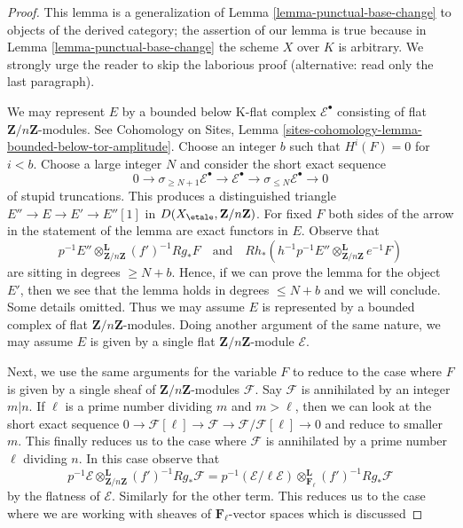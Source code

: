 \begin{proof}
This lemma is a generalization of Lemma \ref{lemma-punctual-base-change}
to objects of the derived category; the assertion of our lemma is true because
in Lemma \ref{lemma-punctual-base-change} the scheme $X$ over $K$
is arbitrary. We strongly urge the reader to skip the laborious proof
(alternative: read only the last paragraph).

\medskip\noindent
We may represent $E$ by a bounded below K-flat complex
$\mathcal{E}^\bullet$ consisting of flat $\mathbf{Z}/n\mathbf{Z}$-modules.
See Cohomology on Sites, Lemma
\ref{sites-cohomology-lemma-bounded-below-tor-amplitude}.
Choose an integer $b$ such that $H^i(F) = 0$ for $i < b$.
Choose a large integer $N$ and consider the short exact sequence
$$
0 \to \sigma_{\geq N + 1}\mathcal{E}^\bullet \to
\mathcal{E}^\bullet \to
\sigma_{\leq N}\mathcal{E}^\bullet \to 0
$$
of stupid truncations. This produces a distinguished triangle
$E'' \to E \to E' \to E''[1]$ in $D(X_\etale, \mathbf{Z}/n\mathbf{Z})$.
For fixed $F$ both sides of the arrow
in the statement of the lemma are exact functors in $E$. Observe that
$$
p^{-1}E'' \otimes_{\mathbf{Z}/n\mathbf{Z}}^\mathbf{L} (f')^{-1}Rg_*F
\quad\text{and}\quad
Rh_*(h^{-1}p^{-1}E'' \otimes_{\mathbf{Z}/n\mathbf{Z}}^\mathbf{L} e^{-1}F)
$$
are sitting in degrees $\geq N + b$. Hence, if we can prove the lemma
for the object $E'$, then we see that the lemma holds in degrees
$\leq N + b$ and we will conclude. Some details omitted.
Thus we may assume $E$ is represented
by a bounded complex of flat $\mathbf{Z}/n\mathbf{Z}$-modules.
Doing another argument of the same nature, we may assume
$E$ is given by a single flat $\mathbf{Z}/n\mathbf{Z}$-module
$\mathcal{E}$.

\medskip\noindent
Next, we use the same arguments for the variable $F$
to reduce to the case where $F$ is given by a single
sheaf of $\mathbf{Z}/n\mathbf{Z}$-modules $\mathcal{F}$.
Say $\mathcal{F}$ is annihilated by an integer $m | n$.
If $\ell$ is a prime number dividing $m$ and $m > \ell$,
then we can look at the short exact sequence
$0 \to \mathcal{F}[\ell] \to \mathcal{F} \to
\mathcal{F}/\mathcal{F}[\ell] \to 0$
and reduce to smaller $m$. This finally reduces us to
the case where $\mathcal{F}$ is annihilated by a prime
number $\ell$ dividing $n$.
In this case observe that
$$
p^{-1}\mathcal{E}
\otimes_{\mathbf{Z}/n\mathbf{Z}}^\mathbf{L}
(f')^{-1}Rg_*\mathcal{F}
=
p^{-1}(\mathcal{E}/\ell \mathcal{E})
\otimes_{\mathbf{F}_\ell}^\mathbf{L}
(f')^{-1}Rg_*\mathcal{F}
$$
by the flatness of $\mathcal{E}$. Similarly for the other term.
This reduces us to the case where we are working with sheaves
of $\mathbf{F}_\ell$-vector spaces which is discussed


\end{proof}
